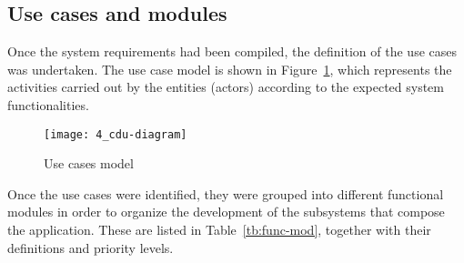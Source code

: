 \subsection{Use cases and modules}

Once the system requirements had been compiled, the definition of the use cases was undertaken. The use case model is shown in Figure~\ref{fig:cdu-model}, which represents the activities carried out by the entities (actors) according to the expected system functionalities.

\begin{figure}
	\centering
	\texttt{[image: 4\_cdu-diagram]}
	\caption[Use cases model]{Use cases model}
	\label{fig:cdu-model}
\end{figure}

Once the use cases were identified, they were grouped into different functional modules in order to organize the development of the subsystems that compose the application. These are listed in Table~\ref{tb:func-mod}, together with their definitions and priority levels.

